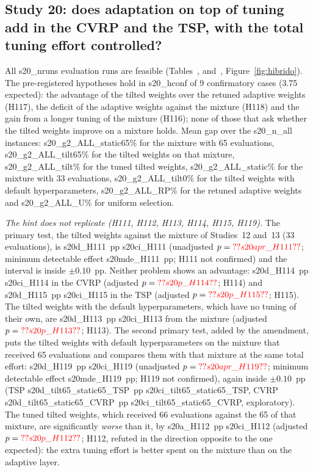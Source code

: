 

\subsection{Study 20: does adaptation on top of tuning add in the CVRP and the TSP, with the total tuning effort controlled?}\label{sec:s20}
All \num{s20_nruns} evaluation runs are feasible (Tables~,  and~, Figure~\ref{fig:hibrido}). The pre-registered hypotheses hold in \num{s20_hconf} of 9 confirmatory cases (3.75 expected): the advantage of the tilted weights over the retuned adaptive weights (H117), the deficit of the adaptive weights against the mixture (H118) and the gain from a longer tuning of the mixture (H116); none of those that ask whether the tilted weights improve on a mixture holds. Mean gap over the \num{s20_n_all} instances: \num{s20_g2_ALL_static65}\% for the mixture with 65 evaluations, \num{s20_g2_ALL_tilt65}\% for the tilted weights on that mixture, \num{s20_g2_ALL_tilt}\% for the tuned tilted weights, \num{s20_g2_ALL_static}\% for the mixture with 33 evaluations, \num{s20_g2_ALL_tilt0}\% for the tilted weights with default hyperparameters, \num{s20_g2_ALL_RP}\% for the retuned adaptive weights and \num{s20_g2_ALL_U}\% for uniform selection.

\emph{The hint does not replicate (H111, H112, H113, H114, H115, H119).} The primary test, the tilted weights against the mixture of Studies~12 and~13 (33 evaluations), is \num{s20d_H111}~pp \num{s20ci_H111} (unadjusted $p=\num{s20apr_H111}$; minimum detectable effect \num{s20mde_H111}~pp; H111 not confirmed) and the interval is inside $\pm0.10$~pp. Neither problem shows an advantage: \num{s20d_H114}~pp \num{s20ci_H114} in the CVRP (adjusted $p=\num{s20p_H114}$; H114) and \num{s20d_H115}~pp \num{s20ci_H115} in the TSP (adjusted $p=\num{s20p_H115}$; H115). The tilted weights with the default hyperparameters, which have no tuning of their own, are \num{s20d_H113}~pp \num{s20ci_H113} from the mixture (adjusted $p=\num{s20p_H113}$; H113). The second primary test, added by the amendment, puts the tilted weights with default hyperparameters on the mixture that received 65 evaluations and compares them with that mixture at the same total effort: \num{s20d_H119}~pp \num{s20ci_H119} (unadjusted $p=\num{s20apr_H119}$; minimum detectable effect \num{s20mde_H119}~pp; H119 not confirmed), again inside $\pm0.10$~pp (TSP \num{s20d_tilt65_static65_TSP}~pp \num{s20ci_tilt65_static65_TSP}, CVRP \num{s20d_tilt65_static65_CVRP}~pp \num{s20ci_tilt65_static65_CVRP}, exploratory). The tuned tilted weights, which received 66 evaluations against the 65 of that mixture, are significantly \emph{worse} than it, by \num{s20a_H112}~pp \num{s20ci_H112} (adjusted $p=\num{s20p_H112}$; H112, refuted in the direction opposite to the one expected): the extra tuning effort is better spent on the mixture than on the adaptive layer.

